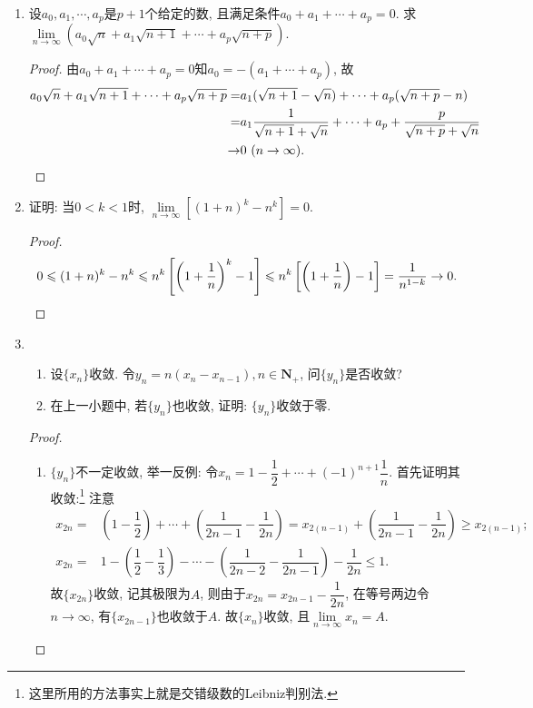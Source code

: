 \documentclass[a4paper,11pt,twoside]{ctexbook}
\begin{document}
\begin{enumerate}
	\item 设$a_0, a_1, \cdots ,a_p$是$p+1$个给定的数, 且满足条件$a_0+a_1+\cdots+a_p=0$. 求$\lim\limits_{n\to\infty} (a_0\sqrt{n}+a_1\sqrt{n+1}+\cdots+a_p\sqrt{n+p})$.
	      \begin{proof}
		      由$a_0+a_1+\cdots+a_p=0$知$a_0=-(a_1+\cdots+a_p)$, 故
		      \[
			      \begin{split}
				      a_0\sqrt{n}+a_1\sqrt{n+1}+\cdots+a_p\sqrt{n+p}=&a_1(\sqrt{n+1}-\sqrt{n})+\cdots+a_p(\sqrt{n+p}-{n})\\
				      =&a_1\dfrac{1}{\sqrt{n+1}+\sqrt{n}}+\cdots+a_p+\dfrac{p}{\sqrt{n+p}+\sqrt{n}}\\
				      \to&0 \ (n\to\infty). \qedhere
			      \end{split}
		      \]
	      \end{proof}

	\item 证明: 当$0<k<1$时, $\lim\limits_{n\to\infty} [(1+n)^k-n^k]=0$.
	      \begin{proof}
		      \[
			      0\leqslant(1+n)^k-n^k\leqslant n^k\left[\left(1+\dfrac{1}{n}\right)^k-1\right]\leqslant n^k\left[\left(1+\dfrac{1}{n}\right)-1\right]=\dfrac{1}{n^{1-k}}\to 0. \qedhere
		      \]
	      \end{proof}

	\item
	      \begin{enumerate}[(1)]
		      \item 设$\{x_n\}$收敛. 令$y_n=n(x_n-x_{n-1}), n\in\mathbf{N}_{+}$, 问$\{y_n\}$是否收敛?
		      \item 在上一小题中, 若$\{y_n\}$也收敛, 证明: $\{y_n\}$收敛于零.
	      \end{enumerate}
	      \begin{proof}
		      \begin{enumerate}[(1)]
			      \item $\{y_n\}$不一定收敛, 举一反例: 令$x_n=1-\dfrac{1}{2}+\cdots+(-1)^{n+1}\dfrac{1}{n}$. 首先证明其收敛:\footnote{这里所用的方法事实上就是交错级数的Leibniz判别法.} 注意
			            \[
				            \begin{split}
					            x_{2n}=&\left(1-\dfrac{1}{2}\right)+\cdots+\left(\dfrac{1}{2n-1}-\dfrac{1}{2n}\right)=x_{2(n-1)}+\left(\dfrac{1}{2n-1}-\dfrac{1}{2n}\right)\geqslant x_{2(n-1)};\\
					            x_{2n}=&1-\left(\dfrac{1}{2}-\dfrac{1}{3}\right)-\cdots-\left(\dfrac{1}{2n-2}-\dfrac{1}{2n-1}\right)-\dfrac{1}{2n}\leqslant 1.
				            \end{split}
			            \]
			            故$\{x_{2n}\}$收敛, 记其极限为$A$, 则由于$x_{2n}=x_{2n-1}-\dfrac{1}{2n}$, 在等号两边令$n\to\infty$, 有$\{x_{2n-1}\}$也收敛于$A$. 故$\{x_n\}$收敛, 且$\lim\limits_{n\to\infty} x_n=A$.


\end{enumerate}
\end{proof}
\end{enumerate}
\end{document}
